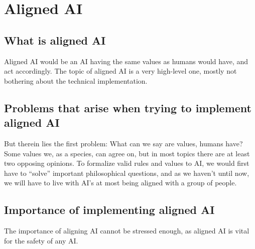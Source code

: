 \chapter{Aligned AI}

\section{What is aligned AI}
Aligned AI would be an AI having the same values as humans would have, and act accordingly. The topic of aligned AI is a very high-level one, mostly not bothering about the technical implementation.
\section{Problems that arise when trying to implement aligned AI}
But therein lies the first problem: What can we say are values, humans have? Some values we, as a species, can agree on, but in most topics there are at least two opposing opinions. To formalize valid rules and values to AI, we would first have to “solve” important philosophical questions, and as we haven't until now, we will have to live with AI's at most being aligned with a group of people.
\section{Importance of implementing aligned AI}
The importance of aligning AI cannot be stressed enough, as aligned AI is vital for the safety of any AI.